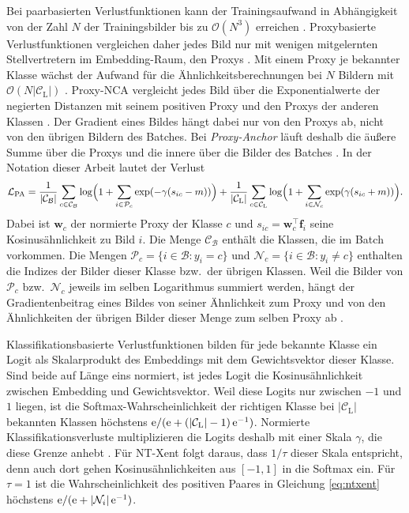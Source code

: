 Bei paarbasierten Verlustfunktionen kann der Trainingsaufwand
in Abhängigkeit von der Zahl $N$ der Trainingsbilder
bis zu $\mathcal{O}(N^3)$ erreichen \cite{kim_proxy_2020}. Proxybasierte Verlustfunktionen vergleichen daher jedes Bild nur mit wenigen mitgelernten Stellvertretern im Embedding-Raum, den Proxys \cite{movshovitz-attias_no_2017, kim_proxy_2020}. Mit einem Proxy je bekannter Klasse wächst der Aufwand für die Ähnlichkeitsberechnungen bei $N$ Bildern mit $\mathcal{O}(N|\mathcal{C}_{\mathrm{L}}|)$ \cite{kim_proxy_2020}. Proxy-NCA vergleicht jedes Bild über die Exponentialwerte der negierten Distanzen mit seinem positiven Proxy und den Proxys der anderen Klassen \cite{movshovitz-attias_no_2017}. Der Gradient eines Bildes hängt dabei nur von den Proxys ab, nicht von den übrigen Bildern des Batches. Bei \emph{Proxy-Anchor} läuft deshalb die äußere Summe über die Proxys und die innere über die Bilder des Batches \cite{kim_proxy_2020}. In der Notation dieser Arbeit lautet der Verlust \cite{kim_proxy_2020, musgrave_pytorch_2020}
\begin{equation}
  \mathcal{L}_{\mathrm{PA}}=\frac{1}{|\mathcal{C}_{\mathcal{B}}|}\sum_{c\in\mathcal{C}_{\mathcal{B}}}\log\Bigl(1+\sum_{i\in\mathcal{P}_c}\exp(-\gamma(s_{ic}-m))\Bigr)+\frac{1}{|\mathcal{C}_{\mathrm{L}}|}\sum_{c\in\mathcal{C}_{\mathrm{L}}}\log\Bigl(1+\sum_{i\in\mathcal{N}_c}\exp(\gamma(s_{ic}+m))\Bigr).
  \label{eq:proxyanchor}
\end{equation}
Dabei ist $\bm{w}_c$ der normierte Proxy der Klasse $c$ und $s_{ic}=\bm{w}_c^{\top}\bm{f}_i$ seine Kosinusähnlichkeit zu Bild $i$. Die Menge $\mathcal{C}_{\mathcal{B}}$ enthält die Klassen, die im Batch vorkommen. Die Mengen $\mathcal{P}_c=\{i\in\mathcal{B}:y_i=c\}$ und $\mathcal{N}_c=\{i\in\mathcal{B}:y_i\ne c\}$ enthalten die Indizes der Bilder dieser Klasse bzw.\ der übrigen Klassen. Weil die Bilder von $\mathcal{P}_c$ bzw.\ $\mathcal{N}_c$ jeweils im selben Logarithmus summiert werden, hängt der Gradientenbeitrag eines Bildes von seiner Ähnlichkeit zum Proxy und von den Ähnlichkeiten der übrigen Bilder dieser Menge zum selben Proxy ab \cite{kim_proxy_2020}. 

Klassifikationsbasierte Verlustfunktionen bilden für jede bekannte Klasse ein Logit als Skalarprodukt des Embeddings mit dem Gewichtsvektor dieser Klasse. Sind beide auf Länge eins normiert, ist jedes Logit die Kosinusähnlichkeit zwischen Embedding und Gewichtsvektor. Weil diese Logits nur zwischen $-1$ und $1$ liegen, ist die Softmax-Wahrscheinlichkeit der richtigen Klasse bei $|\mathcal{C}_{\mathrm{L}}|$ bekannten Klassen höchstens $\mathrm{e}/(\mathrm{e}+(|\mathcal{C}_{\mathrm{L}}|-1)\,\mathrm{e}^{-1})$. Normierte Klassifikationsverluste multiplizieren die Logits deshalb mit einer Skala $\gamma$, die diese Grenze anhebt \cite{wang_normface_2017}. Für \ac{NT-Xent} folgt daraus, dass $1/\tau$ dieser Skala entspricht, denn auch dort gehen Kosinusähnlichkeiten aus $[-1,1]$ in die Softmax ein. Für $\tau=1$ ist die Wahrscheinlichkeit des positiven Paares in Gleichung \eqref{eq:ntxent} höchstens $\mathrm{e}/(\mathrm{e}+|\mathcal{N}_i|\,\mathrm{e}^{-1})$. 

